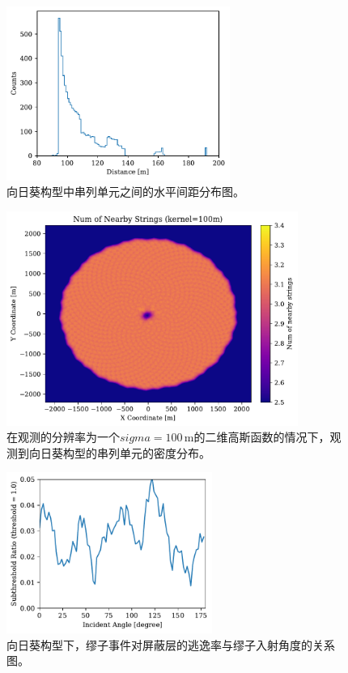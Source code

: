 \begin{figure}[!htb]%
    \centering
    \includegraphics[width=0.65\textwidth]{img/distance_spectrum_sunflower.pdf}
    \caption{向日葵构型中串列单元之间的水平间距分布图。}
    \label{fig:distance_spectrum_sunflower}
\end{figure}

\begin{figure}[!htb]%
    \centering
    \includegraphics[width=0.85\textwidth]{img/string_density_sunflower.pdf}
    \caption{在观测的分辨率为一个$sigma = 100\,\mathrm{m}$的二维高斯函数的情况下，观测到向日葵构型的串列单元的密度分布。}
    \label{fig:string_density_sunflower}
\end{figure}

\begin{figure}[!htb]%
    \centering
    \includegraphics[width=0.60\textwidth]{img/corridor_angle_sunflower.pdf}
    \caption{向日葵构型下，缪子事件对屏蔽层的逃逸率与缪子入射角度的关系图。}
    \label{fig:corridor_angle_sunflower}
\end{figure}

